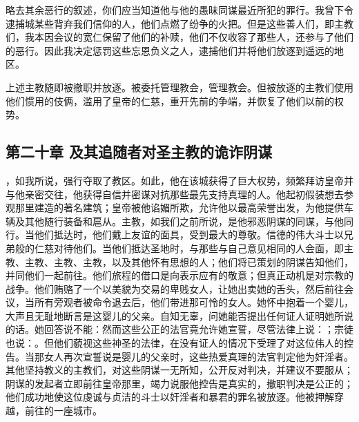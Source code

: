 略去其余恶行的叙述，你们应当知道他与他的愚昧同谋最近所犯的罪行。我曾下令逮捕城某些背弃我们信仰的人，他们点燃了纷争的火把。但是这些善人们，即主教们，我本因会议的宽仁保留了他们的补赎，他们不仅收容了那些人，还参与了他们的恶行。因此我决定惩罚这些忘恩负义之人，逮捕他们并将他们放逐到遥远的地区。\par

\par

上述主教随即被撤职并放逐。被委托管理教会，管理教会。但被放逐的主教们使用他们惯用的伎俩，滥用了皇帝的仁慈，重开先前的争端，并恢复了他们以前的权势。\par


\subsection{第二十章 及其追随者对圣主教的诡诈阴谋}

，如我所说，强行夺取了教区。如此，他在该城获得了巨大权势，频繁拜访皇帝并与他亲密交往，他获得自信并密谋对抗那些最先支持真理的人。他起初假装想去参观那里建造的著名建筑；皇帝被他谄媚所欺，允许他以最高荣誉出发，为他提供车辆及其他随行装备和扈从。主教，如我们之前所说，是他邪恶阴谋的同谋，与他同行。当他们抵达时，他们戴上友谊的面具，受到最大的尊敬。信德的伟大斗士以兄弟般的仁慈对待他们。当他们抵达圣地时，与那些与自己意见相同的人会面，即主教、主教、主教、主教，以及其他怀有思想的人；他们将已策划的阴谋告知他们，并同他们一起前往。他们旅程的借口是向表示应有的敬意；但真正动机是对宗教的战争。他们贿赂了一个以美貌为交易的卑贱女人，让她出卖她的舌头，然后前往会议，当所有旁观者被命令退去后，他们带进那可怜的女人。她怀中抱着一个婴儿，大声且无耻地断言是这婴儿的父亲。自知无辜，问她能否提出任何证人证明她所说的话。她回答说不能：然而这些公正的法官竟允许她宣誓，尽管法律上说：；宗徒也说：。但他们藐视这些神圣的法律，在没有证人的情况下受理了对这位伟人的控告。当那女人再次宣誓说是婴儿的父亲时，这些热爱真理的法官判定他为奸淫者。其他坚持教义的主教们，对这些阴谋一无所知，公开反对判决，并建议不要服从；阴谋的发起者立即前往皇帝那里，竭力说服他控告是真实的，撤职判决是公正的；他们成功地使这位虔诚与贞洁的斗士以奸淫者和暴君的罪名被放逐。他被押解穿越，前往的一座城市。\par

